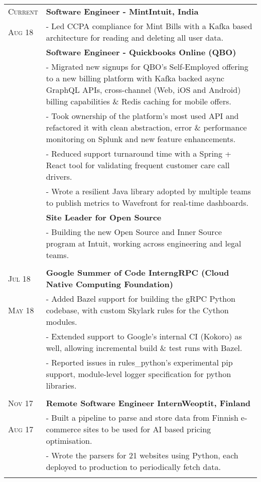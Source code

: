 \documentclass[a4paper,10pt]{extarticle} %
\begin{document}
\begin{tabularx}{\linewidth}{ l | X }

\textsc{Current} & \textbf{Software Engineer - Mint}\hfill\textbf{Intuit, India}\\
\textsc{Aug 18} & {- Led CCPA compliance for Mint Bills with a Kafka based architecture for reading and deleting all user data.}\\
& \textbf{Software Engineer - Quickbooks Online (QBO)}\\
& {- Migrated new signups for QBO's Self-Employed offering to a new billing platform with Kafka backed async GraphQL APIs, cross-channel (Web, iOS and Android) billing capabilities \& Redis caching for mobile offers.}\\
& {- Took ownership of the platform's most used API and refactored it with clean abstraction, error \& performance monitoring on Splunk and new feature enhancements.}\\
& {- Reduced support turnaround time with a Spring + React tool for validating frequent customer care call drivers.}\\
& {- Wrote a resilient Java library adopted by multiple teams to publish metrics to Wavefront for real-time dashboards.}\\
& \textbf{Site Leader for Open Source}\\
& {- Building the new Open Source and Inner Source program at Intuit, working across engineering and legal teams.}\\
\multicolumn{2}{c}{} \\

\textsc{Jul 18} & \textbf{Google Summer of Code Intern}\hfill\textbf{gRPC (Cloud Native Computing Foundation)}\\
\textsc{May 18}& {- Added Bazel support for building the gRPC Python codebase, with custom Skylark rules for the Cython modules.}\\
& {- Extended support to Google's internal CI (Kokoro) as well, allowing incremental build \& test runs with Bazel.}\\
& {- Reported issues in rules\_python's experimental pip support, module-level logger specification for python libraries.}\\
\multicolumn{2}{c}{} \\

\textsc{Nov 17} & \textbf{Remote Software Engineer Intern}\hfill\textbf{Weoptit, Finland}\\
\textsc{Aug 17}& {- Built a pipeline to parse and store data from Finnish e-commerce sites to be used for AI based pricing optimisation.}\\
& {- Wrote the parsers for 21 websites using Python, each deployed to production to periodically fetch data.}\\
\multicolumn{2}{c}{} \\


\end{tabularx}
\end{document}
